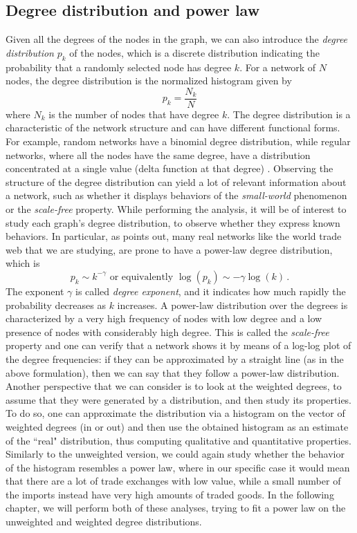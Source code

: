 \subsection{Degree distribution and power law}
Given all the degrees of the nodes in the graph, we can also introduce the \textit{degree distribution} $p_k$ of the nodes, which is a discrete distribution indicating the probability that a randomly selected node has degree $k$. For a network of $N$ nodes, the degree distribution is the normalized histogram given by 
\[ 
    p_k = \frac{N_k}{N} 
\]
where $N_k$ is the number of nodes that have degree $k$. 
The degree distribution is a characteristic of the network structure and can have different functional forms. For example, random networks have a binomial degree distribution, while regular networks, where all the nodes have the same degree, have a distribution concentrated at a single value (delta function at that degree) \cite{sajedianfard2021quantitative}. Observing the structure of the degree distribution can yield a lot of relevant information about a network, such as whether it displays behaviors of the \textit{small-world} phenomenon or the \textit{scale-free} property.
While performing the analysis, it will be of interest to study each graph's degree distribution, to observe whether they express known behaviors. In particular, as \textcite{barabasi2016network} points out, many real networks like the world trade web that we are studying, are prone to have a power-law degree distribution, which is
\[
    p_k \sim k^{-\gamma} \text{ or equivalently } \log(p_k) \sim -\gamma \log(k) \,.
\]
The exponent $\gamma$ is called \textit{degree exponent}, and it indicates how much rapidly the probability decreases as $k$ increases. A power-law distribution over the degrees is characterized by a very high frequency of nodes with low degree and a low presence of nodes with considerably high degree. This is called the \textit{scale-free} property and one can verify that a network shows it by means of a log-log plot of the degree frequencies: if they can be approximated by a straight line (as in the above formulation), then we can say that they follow a power-law distribution.
Another perspective that we can consider is to look at the weighted degrees, to assume that they were generated by a distribution, and then study its properties. To do so, one can approximate the distribution via a histogram on the vector of weighted degrees (in or out) and then use the obtained histogram as an estimate of the ``real" distribution, thus computing qualitative and quantitative properties. Similarly to the unweighted version, we could again study whether the behavior of the histogram resembles a power law, where in our specific case it would mean that there are a lot of trade exchanges with low value, while a small number of the imports instead have very high amounts of traded goods. In the following chapter, we will perform both of these analyses, trying to fit a power law on the unweighted and weighted degree distributions.


